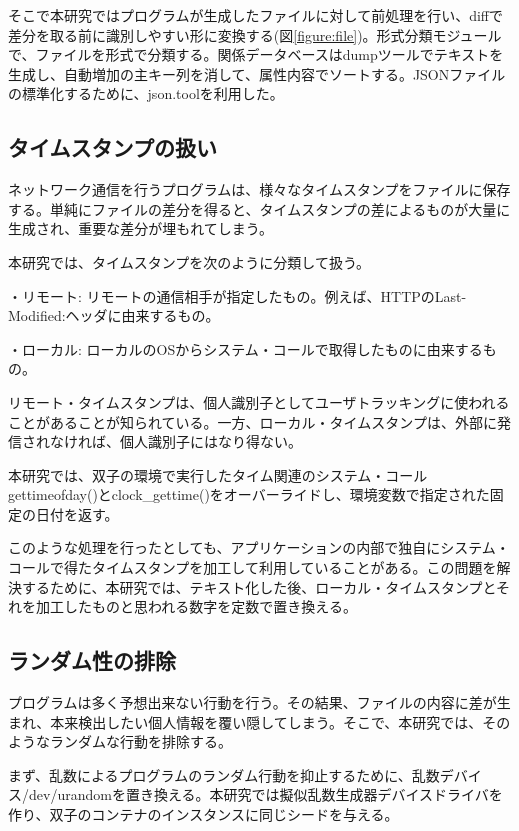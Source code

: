 \documentclass[a4paper,twocolumn,10pt]{jarticle}
\begin{document}
そこで本研究ではプログラムが生成したファイルに対して前処理を行い、diffで差分を取る前に識別しやすい形に変換する(図\ref{figure:file})。形式分類モジュールで、ファイルを形式で分類する。関係データベースはdumpツールでテキストを生成し、自動増加の主キー列を消して、属性内容でソートする。JSONファイルの標準化するために、json.toolを利用した。


\subsection{タイムスタンプの扱い}
\label{cha:timestamp}
ネットワーク通信を行うプログラムは、様々なタイムスタンプをファイルに保存する。単純にファイルの差分を得ると、タイムスタンプの差によるものが大量に生成され、重要な差分が埋もれてしまう。

本研究では、タイムスタンプを次のように分類して扱う。
\begin{description}
\item{・リモート: }
リモートの通信相手が指定したもの。例えば、HTTPのLast-Modified:ヘッダに由来するもの。
\item{・ローカル: }
ローカルのOSからシステム・コールで取得したものに由来するもの。
\end{description}
リモート・タイムスタンプは、個人識別子としてユーザトラッキングに使われることがあることが知られている。一方、ローカル・タイムスタンプは、外部に発信されなければ、個人識別子にはなり得ない。

本研究では、双子の環境で実行したタイム関連のシステム・コールgettimeofday()とclock\_gettime()をオーバーライドし、環境変数で指定された固定の日付を返す。

このような処理を行ったとしても、アプリケーションの内部で独自にシステム・コールで得たタイムスタンプを加工して利用していることがある。この問題を解決するために、本研究では、テキスト化した後、ローカル・タイムスタンプとそれを加工したものと思われる数字を定数で置き換える。

\subsection{ランダム性の排除}

プログラムは多く予想出来ない行動を行う。その結果、ファイルの内容に差が生まれ、本来検出したい個人情報を覆い隠してしまう。そこで、本研究では、そのようなランダムな行動を排除する。

まず、乱数によるプログラムのランダム行動を抑止するために、乱数デバイス/dev/urandomを置き換える。本研究では擬似乱数生成器デバイスドライバを作り、双子のコンテナのインスタンスに同じシードを与える。
\end{document}
